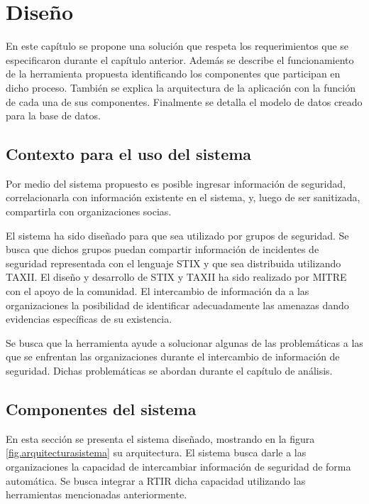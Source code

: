 \makeatother
\setlength\tabcolsep{1mm}
\renewcommand\arraystretch{1.3}
\renewcommand\theFigura{\arabic{FiguraCap4}}
\renewcommand\theTabla{\arabic{TablaCap4}}

\chapter{Diseño}
\label{capitulo4}
	En este capítulo se propone una solución que respeta los requerimientos que se especificaron
		durante el capítulo anterior. Además se describe el funcionamiento de la herramienta propuesta identificando los componentes que
		participan en dicho proceso. También se explica la arquitectura de la aplicación con la función de cada una de sus
		componentes. Finalmente se detalla el modelo de datos creado para la base de datos.
	
	\section{Contexto para el uso del sistema} 
	Por medio del sistema propuesto es posible ingresar información de seguridad, correlacionarla
		con información existente en el sistema, y, luego de ser sanitizada, compartirla con organizaciones socias.
	
	
	\bigskip
	
	El sistema ha sido diseñado para que sea utilizado por grupos de seguridad. Se busca que
		dichos grupos puedan compartir información de incidentes de seguridad representada con el lenguaje STIX y que sea
		distribuida utilizando TAXII. El diseño y desarrollo de STIX y TAXII ha sido realizado por MITRE con el apoyo de la
		comunidad. El intercambio de información da a las organizaciones la posibilidad de identificar adecuadamente las
		amenazas dando evidencias específicas de su existencia.
	
	
	\bigskip
	
	Se busca que la herramienta ayude a solucionar algunas de las problemáticas a las que se
		enfrentan las organizaciones durante el intercambio de información de seguridad. Dichas problemáticas se abordan
		durante el capítulo de análisis.
	
	\section{Componentes del sistema}
	
	\bigskip
	
	En esta sección se presenta el sistema diseñado, mostrando en la figura \ref{fig.arquitecturasistema} su arquitectura. El sistema busca darle a las organizaciones la capacidad de intercambiar
		información de seguridad de forma automática. Se busca integrar a RTIR dicha capacidad utilizando las herramientas
		mencionadas anteriormente.
	
